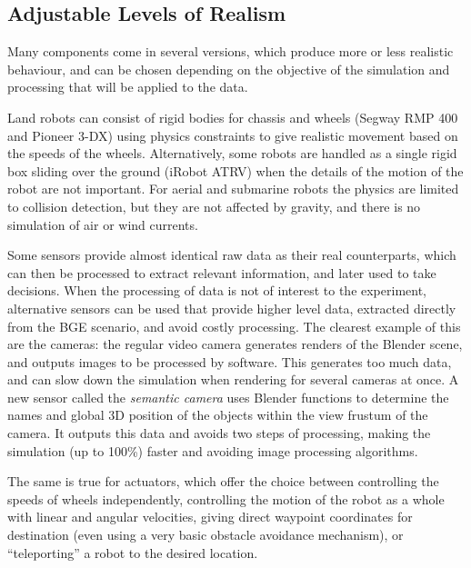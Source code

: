 \documentclass{llncs}
\begin{document}
\subsection{Adjustable Levels of Realism}
\label{section:realism}

Many components come in several versions, which produce more or less
realistic behaviour, and can be chosen depending on the objective of the
simulation and processing that will be applied to the data.

Land robots can consist of rigid bodies for chassis and wheels (Segway RMP 400
and Pioneer 3-DX) using physics constraints to give realistic movement based on
the speeds of the wheels. Alternatively, some robots are handled as a single
rigid box sliding over the ground (iRobot ATRV) when the details of the motion
of the robot are not important. For aerial and submarine robots the
physics are limited to collision detection, but they are not affected by
gravity, and there is no simulation of air or wind currents.

Some sensors provide almost identical raw data as their real counterparts,
which can then be processed to extract relevant information,
and later used to take decisions. When the processing of data is not of
interest to the experiment, alternative sensors can be used that provide
higher level data, extracted directly from the BGE scenario, and avoid costly
processing.
The clearest example of this are the cameras: the regular video camera
generates renders of the Blender scene, and outputs images to be processed by
software. This generates too much data, and can slow down the simulation when
rendering for several cameras at once. A new sensor called the \emph{semantic
camera} uses Blender functions to determine the names and global 3D position of
the objects within the view frustum of the camera. It outputs this data and
avoids two steps of processing, making the simulation (up to 100\%) faster and
avoiding image processing algorithms.

The same is true for actuators, which offer the choice between controlling the
speeds of wheels independently, controlling the motion of the robot as a whole
with linear and angular velocities, giving direct waypoint coordinates for
destination (even using a very basic obstacle avoidance mechanism), or
``teleporting'' a robot to the desired location.
\end{document}
